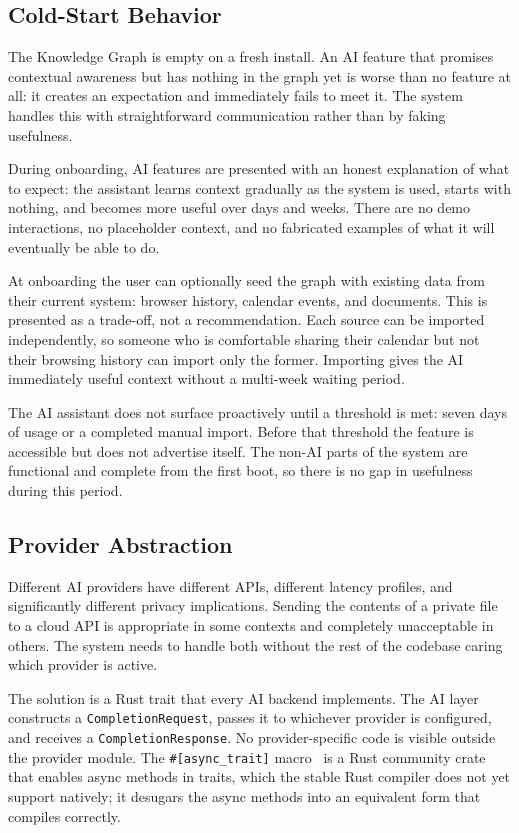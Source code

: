 \subsection{Cold-Start Behavior}
\label{sec:ai-coldstart}

The Knowledge Graph is empty on a fresh install. An AI feature that promises
contextual awareness but has nothing in the graph yet is worse than no feature
at all: it creates an expectation and immediately fails to meet it. The system
handles this with straightforward communication rather than by faking
usefulness.

During onboarding, AI features are presented with an honest explanation of
what to expect: the assistant learns context gradually as the system is used,
starts with nothing, and becomes more useful over days and weeks. There are no
demo interactions, no placeholder context, and no fabricated examples of what
it will eventually be able to do.

At onboarding the user can optionally seed the graph with existing data from
their current system: browser history, calendar events, and documents. This is
presented as a trade-off, not a recommendation. Each source can be imported
independently, so someone who is comfortable sharing their calendar but not
their browsing history can import only the former. Importing gives the AI
immediately useful context without a multi-week waiting period.

The AI assistant does not surface proactively until a threshold is met: seven
days of usage or a completed manual import. Before that threshold the feature
is accessible but does not advertise itself. The non-AI parts of the system are
functional and complete from the first boot, so there is no gap in usefulness
during this period.

\subsection{Provider Abstraction}
\label{sec:ai-providers}

Different AI providers have different APIs, different latency profiles, and
significantly different privacy implications. Sending the contents of a private
file to a cloud API is appropriate in some contexts and completely unacceptable
in others. The system needs to handle both without the rest of the codebase
caring which provider is active.

The solution is a Rust trait that every AI backend implements. The AI layer
constructs a \texttt{CompletionRequest}, passes it to whichever provider is
configured, and receives a \texttt{CompletionResponse}. No provider-specific
code is visible outside the provider module. The \texttt{\#[async\_trait]}
macro~\cite{async-trait} is a Rust community crate that enables async methods
in traits, which the stable Rust compiler does not yet support natively; it
desugars the async methods into an equivalent form that compiles correctly.

